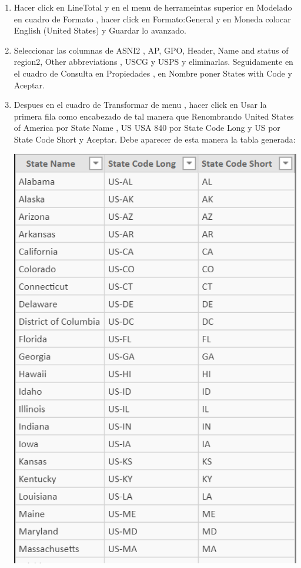 \begin{itemize}
\begin{enumerate}
\item Hacer click en LineTotal	 y en el menu de herrameintas superior  en Modelado en cuadro de Formato , hacer click en Formato:General y en Moneda colocar English (United States) y Guardar lo avanzado.

\item Seleccionar las columnas de ASNI2 , AP, GPO, Header, Name and status of region2, Other abbreviations , USCG y USPS y eliminarlas. Seguidamente en el cuadro de Consulta en Propiedades , en Nombre poner States with Code y Aceptar.
\item Despues  en el cuadro de Transformar de menu , hacer click en Usar la primera fila como encabezado de tal manera que Renombrando United States of America por State Name , US USA 840 por State Code Long y US por State Code Short y Aceptar. Debe aparecer de esta manera la tabla generada:
\begin{center}
\includegraphics[scale=1]{./Imagenes/tarea3_renombrartablas.png}
\end{center}


\end{enumerate}
\end{itemize}
